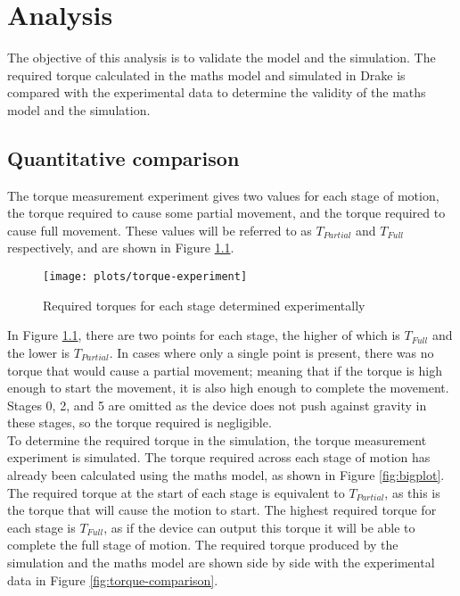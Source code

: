 \chapter{Analysis}

The objective of this analysis is to validate the model and the simulation. The required torque calculated in the maths model and simulated in Drake is compared with the experimental data to determine the validity of the maths model and the simulation.

\section{Quantitative comparison}

The torque measurement experiment gives two values for each stage of motion, the torque required to cause some partial movement, and the torque required to cause full movement. These values will be referred to as $T_{Partial}$ and $T_{Full}$ respectively, and are shown in Figure \ref{fig:torque-experiment}.\\

\begin{figure}[!h]
	\centering
	\texttt{[image: plots/torque-experiment]}
	\caption{Required torques for each stage determined experimentally}
	\label{fig:torque-experiment}
\end{figure}

In Figure \ref{fig:torque-experiment}, there are two points for each stage, the higher of which is $T_{Full}$ and the lower is $T_{Partial}$. In cases where only a single point is present, there was no torque that would cause a partial movement; meaning that if the torque is high enough to start the movement, it is also high enough to complete the movement. Stages 0, 2, and 5 are omitted as the device does not push against gravity in these stages, so the torque required is negligible.\\

To determine the required torque in the simulation, the torque measurement experiment is simulated. The torque required across each stage of motion has already been calculated using the maths model, as shown in Figure \ref{fig:bigplot}. The required torque at the start of each stage is equivalent to $T_{Partial}$, as this is the torque that will cause the motion to start. The highest required torque for each stage is $T_{Full}$, as if the device can output this torque it will be able to complete the full stage of motion. The required torque produced by the simulation and the maths model are shown side by side with the experimental data in Figure \ref{fig:torque-comparison}.\\

